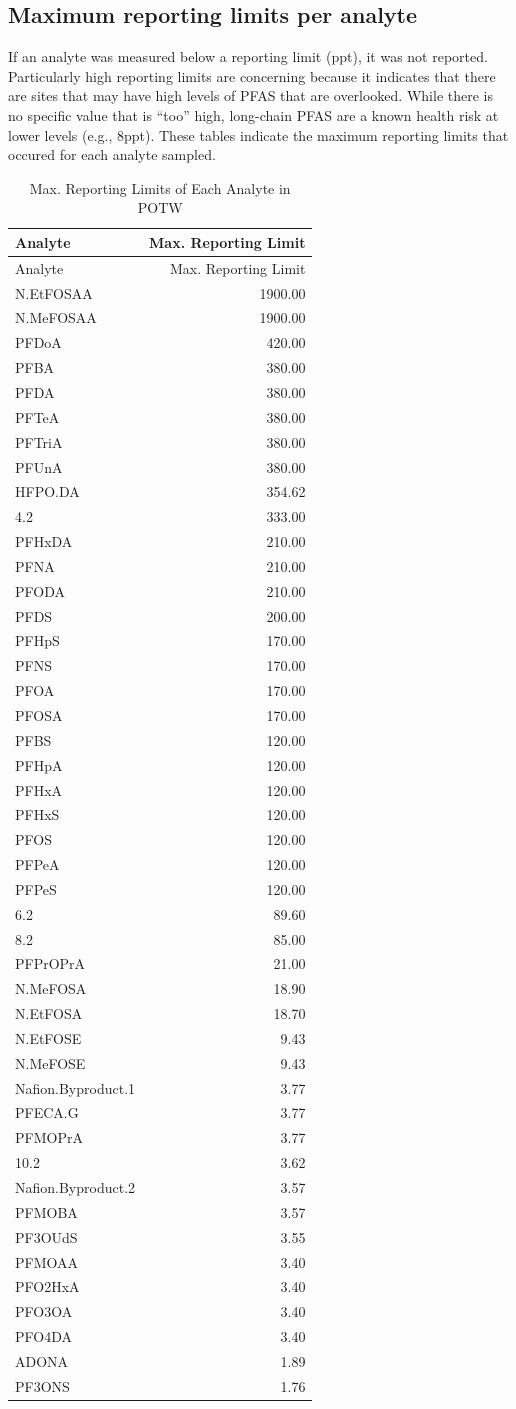 \documentclass[
  12pt,
]{article}
\begin{document}
\hypertarget{maximum-reporting-limits-per-analyte}{%
\subsection{Maximum reporting limits per
analyte}\label{maximum-reporting-limits-per-analyte}}

If an analyte was measured below a reporting limit (ppt), it was not
reported. Particularly high reporting limits are concerning because it
indicates that there are sites that may have high levels of PFAS that
are overlooked. While there is no specific value that is ``too'' high,
long-chain PFAS are a known health risk at lower levels (e.g., 8ppt).
These tables indicate the maximum reporting limits that occured for each
analyte sampled.

\begin{longtable}[]{@{}lr@{}}
\caption{Max. Reporting Limits of Each Analyte in POTW}\tabularnewline
\toprule
Analyte & Max. Reporting Limit\tabularnewline
\midrule
\endfirsthead
\toprule
Analyte & Max. Reporting Limit\tabularnewline
\midrule
\endhead
N.EtFOSAA & 1900.00\tabularnewline
N.MeFOSAA & 1900.00\tabularnewline
PFDoA & 420.00\tabularnewline
PFBA & 380.00\tabularnewline
PFDA & 380.00\tabularnewline
PFTeA & 380.00\tabularnewline
PFTriA & 380.00\tabularnewline
PFUnA & 380.00\tabularnewline
HFPO.DA & 354.62\tabularnewline
4.2 & 333.00\tabularnewline
PFHxDA & 210.00\tabularnewline
PFNA & 210.00\tabularnewline
PFODA & 210.00\tabularnewline
PFDS & 200.00\tabularnewline
PFHpS & 170.00\tabularnewline
PFNS & 170.00\tabularnewline
PFOA & 170.00\tabularnewline
PFOSA & 170.00\tabularnewline
PFBS & 120.00\tabularnewline
PFHpA & 120.00\tabularnewline
PFHxA & 120.00\tabularnewline
PFHxS & 120.00\tabularnewline
PFOS & 120.00\tabularnewline
PFPeA & 120.00\tabularnewline
PFPeS & 120.00\tabularnewline
6.2 & 89.60\tabularnewline
8.2 & 85.00\tabularnewline
PFPrOPrA & 21.00\tabularnewline
N.MeFOSA & 18.90\tabularnewline
N.EtFOSA & 18.70\tabularnewline
N.EtFOSE & 9.43\tabularnewline
N.MeFOSE & 9.43\tabularnewline
Nafion.Byproduct.1 & 3.77\tabularnewline
PFECA.G & 3.77\tabularnewline
PFMOPrA & 3.77\tabularnewline
10.2 & 3.62\tabularnewline
Nafion.Byproduct.2 & 3.57\tabularnewline
PFMOBA & 3.57\tabularnewline
PF3OUdS & 3.55\tabularnewline
PFMOAA & 3.40\tabularnewline
PFO2HxA & 3.40\tabularnewline
PFO3OA & 3.40\tabularnewline
PFO4DA & 3.40\tabularnewline
ADONA & 1.89\tabularnewline
PF3ONS & 1.76\tabularnewline
\bottomrule
\end{longtable}
\end{document}
